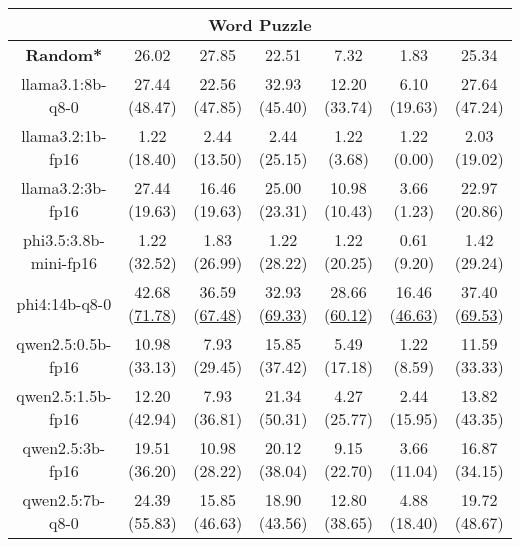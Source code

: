 \begin{table}[hbp]
{\begin{tabular}{ccccccc}
\hline
\multicolumn{7}{c}{Word Puzzle} \\ \hline
\multicolumn{1}{c|}{\textbf{Random*}} & 26.02 & 27.85 & \multicolumn{1}{c|}{22.51} & 7.32 & \multicolumn{1}{c|}{1.83} & 25.34 \\ \hline

        \multicolumn{1}{c|}{llama3.1:8b-q8-0} & 27.44 (48.47) & 22.56 (47.85) & \multicolumn{1}{c|}{32.93 (45.40)} & 12.20 (33.74) & \multicolumn{1}{c|}{6.10 (19.63)} & 27.64 (47.24) \\
        

        \multicolumn{1}{c|}{llama3.2:1b-fp16} & 1.22 (18.40) & 2.44 (13.50) & \multicolumn{1}{c|}{2.44 (25.15)} & 1.22 (3.68) & \multicolumn{1}{c|}{1.22 (0.00)} & 2.03 (19.02) \\
        

        \multicolumn{1}{c|}{llama3.2:3b-fp16} & 27.44 (19.63) & 16.46 (19.63) & \multicolumn{1}{c|}{25.00 (23.31)} & 10.98 (10.43) & \multicolumn{1}{c|}{3.66 (1.23)} & 22.97 (20.86) \\
        

        \multicolumn{1}{c|}{phi3.5:3.8b-mini-fp16} & 1.22 (32.52) & 1.83 (26.99) & \multicolumn{1}{c|}{1.22 (28.22)} & 1.22 (20.25) & \multicolumn{1}{c|}{0.61 (9.20)} & 1.42 (29.24) \\
        

        \multicolumn{1}{c|}{phi4:14b-q8-0} & 42.68 (\underline{71.78}) & 36.59 (\underline{67.48}) & \multicolumn{1}{c|}{32.93 (\underline{69.33})} & 28.66 (\underline{60.12}) & \multicolumn{1}{c|}{16.46 (\underline{46.63})} & 37.40 (\underline{69.53}) \\
        

        \multicolumn{1}{c|}{qwen2.5:0.5b-fp16} & 10.98 (33.13) & 7.93 (29.45) & \multicolumn{1}{c|}{15.85 (37.42)} & 5.49 (17.18) & \multicolumn{1}{c|}{1.22 (8.59)} & 11.59 (33.33) \\
        

        \multicolumn{1}{c|}{qwen2.5:1.5b-fp16} & 12.20 (42.94) & 7.93 (36.81) & \multicolumn{1}{c|}{21.34 (50.31)} & 4.27 (25.77) & \multicolumn{1}{c|}{2.44 (15.95)} & 13.82 (43.35) \\
        

        \multicolumn{1}{c|}{qwen2.5:3b-fp16} & 19.51 (36.20) & 10.98 (28.22) & \multicolumn{1}{c|}{20.12 (38.04)} & 9.15 (22.70) & \multicolumn{1}{c|}{3.66 (11.04)} & 16.87 (34.15) \\
        

        \multicolumn{1}{c|}{qwen2.5:7b-q8-0} & 24.39 (55.83) & 15.85 (46.63) & \multicolumn{1}{c|}{18.90 (43.56)} & 12.80 (38.65) & \multicolumn{1}{c|}{4.88 (18.40)} & 19.72 (48.67) \\
        


\end{tabular}}
\end{table}
